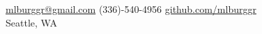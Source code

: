 \documentclass[10pt,a4paper]{article}
\begin{document}
\sloppy  %


\let\olditemize=\itemize \let\endolditemize=\enditemize \renewenvironment{itemize}{\olditemize \itemsep0.1em}{\endolditemize}


\nobreakvspace{0.3em}  %

\noindent\href{mailto:mlburggr@gmail.com}{mlburggr\mbox{}@\mbox{}gmail.com}\sbull
(336)-540-4956\sbull
\href{https://github.com/mlburggr}{github.com/mlburggr}
\\
Seattle, WA

\spacedhrule{0.9em}{-0.4em}  %

\end{document}
